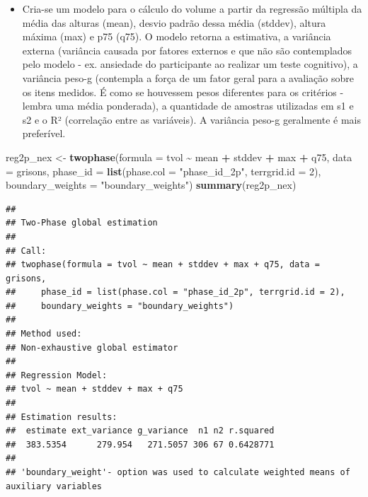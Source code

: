 \documentclass[
]{article}
\newenvironment{Shaded}{\begin{snugshade}}{\end{snugshade}}
\newcommand{\AttributeTok}[1]{\textcolor[rgb]{0.13,0.29,0.53}{#1}}
\newcommand{\DecValTok}[1]{\textcolor[rgb]{0.00,0.00,0.81}{#1}}
\newcommand{\FunctionTok}[1]{\textcolor[rgb]{0.13,0.29,0.53}{\textbf{#1}}}
\newcommand{\NormalTok}[1]{#1}
\newcommand{\OtherTok}[1]{\textcolor[rgb]{0.56,0.35,0.01}{#1}}
\newcommand{\SpecialCharTok}[1]{\textcolor[rgb]{0.81,0.36,0.00}{\textbf{#1}}}
\newcommand{\StringTok}[1]{\textcolor[rgb]{0.31,0.60,0.02}{#1}}
\providecommand{\tightlist}{%
  \setlength{\itemsep}{0pt}\setlength{\parskip}{0pt}}
\begin{document}
\begin{itemize}
\tightlist
\item
  Cria-se um modelo para o cálculo do volume a partir da regressão
  múltipla da média das alturas (mean), desvio padrão dessa média
  (stddev), altura máxima (max) e p75 (q75). O modelo retorna a
  estimativa, a variância externa (variância causada por fatores
  externos e que não são contemplados pelo modelo - ex. ansiedade do
  participante ao realizar um teste cognitivo), a variância peso-g
  (contempla a força de um fator geral para a avaliação sobre os itens
  medidos. É como se houvessem pesos diferentes para os critérios -
  lembra uma média ponderada), a quantidade de amostras utilizadas em s1
  e s2 e o R² (correlação entre as variáveis). A variância peso-g
  geralmente é mais preferível.
\end{itemize}

\begin{Shaded}
\begin{Highlighting}[]
\NormalTok{reg2p\_nex }\OtherTok{\textless{}{-}} \FunctionTok{twophase}\NormalTok{(}\AttributeTok{formula =}\NormalTok{ tvol }\SpecialCharTok{\textasciitilde{}}\NormalTok{ mean }\SpecialCharTok{+}\NormalTok{ stddev }\SpecialCharTok{+}\NormalTok{ max }\SpecialCharTok{+}\NormalTok{ q75, }
                      \AttributeTok{data =}\NormalTok{ grisons, }\AttributeTok{phase\_id =} \FunctionTok{list}\NormalTok{(}\AttributeTok{phase.col =} \StringTok{"phase\_id\_2p"}\NormalTok{,}
                      \AttributeTok{terrgrid.id =} \DecValTok{2}\NormalTok{), }\AttributeTok{boundary\_weights =} \StringTok{"boundary\_weights"}\NormalTok{)}
\FunctionTok{summary}\NormalTok{(reg2p\_nex)}
\end{Highlighting}
\end{Shaded}

\begin{verbatim}
## 
## Two-Phase global estimation
##  
## Call: 
## twophase(formula = tvol ~ mean + stddev + max + q75, data = grisons, 
##     phase_id = list(phase.col = "phase_id_2p", terrgrid.id = 2), 
##     boundary_weights = "boundary_weights")
## 
## Method used:
## Non-exhaustive global estimator
##  
## Regression Model:
## tvol ~ mean + stddev + max + q75
## 
## Estimation results:
##  estimate ext_variance g_variance  n1 n2 r.squared
##  383.5354      279.954   271.5057 306 67 0.6428771
## 
## 'boundary_weight'- option was used to calculate weighted means of auxiliary variables
\end{verbatim}
\end{document}

